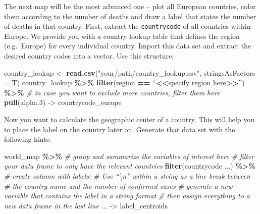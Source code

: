 \documentclass[
  11pt,
]{article}
\newenvironment{Shaded}{\begin{snugshade}}{\end{snugshade}}
\newcommand{\CommentTok}[1]{\textcolor[rgb]{0.56,0.35,0.01}{\textit{#1}}}
\newcommand{\DataTypeTok}[1]{\textcolor[rgb]{0.13,0.29,0.53}{#1}}
\newcommand{\ErrorTok}[1]{\textcolor[rgb]{0.64,0.00,0.00}{\textbf{#1}}}
\newcommand{\FloatTok}[1]{\textcolor[rgb]{0.00,0.00,0.81}{#1}}
\newcommand{\KeywordTok}[1]{\textcolor[rgb]{0.13,0.29,0.53}{\textbf{#1}}}
\newcommand{\NormalTok}[1]{#1}
\newcommand{\OperatorTok}[1]{\textcolor[rgb]{0.81,0.36,0.00}{\textbf{#1}}}
\newcommand{\StringTok}[1]{\textcolor[rgb]{0.31,0.60,0.02}{#1}}
\newenvironment{tips}[1]
  {
  \begin{itemize}
  \footnotesize
  \renewcommand{\labelitemi}{
    \raisebox{-.7\height}[0pt][0pt]{
      {\setkeys{Gin}{width=3em,keepaspectratio}
        \texttt{[image: images/\#1.png]}}
    }
  }
  \setlength{\fboxsep}{1em}
  \begin{rbox}
  \item
  }
  {
  \end{rbox}
  \end{itemize}
  }
\begin{document}
\begin{tips}r

The next map will be the most advanced one -- plot all European countries, color them according to the number of deaths and draw a label that states the number of deaths in that country. First, extract the \texttt{countrycode} of all countries within Europe. We provide you with a country lookup table that defines the region (e.g.~Europe) for every individual country. Import this data set and extract the desired country codes into a vector. Use this structure:

\begin{Shaded}
\begin{Highlighting}[]
\NormalTok{country\_lookup \textless{}{-}}\StringTok{ }\KeywordTok{read.csv}\NormalTok{(}\StringTok{"your/path/country\_lookup.csv"}\NormalTok{, }\DataTypeTok{stringsAsFactors =}\NormalTok{ T)}
\NormalTok{country\_lookup }\OperatorTok{\%\textgreater{}\%}\StringTok{ }
\StringTok{  }\KeywordTok{filter}\NormalTok{(region }\OperatorTok{==}\StringTok{ }\NormalTok{“}\OperatorTok{\textless{}}\ErrorTok{\textless{}}\NormalTok{specify region here}\OperatorTok{\textgreater{}}\ErrorTok{\textgreater{}}\NormalTok{”) }\OperatorTok{\%\textgreater{}\%}
\StringTok{  }\CommentTok{\# in case you want to exclude more countries, filter them here         }
\StringTok{  }\KeywordTok{pull}\NormalTok{(alpha}\FloatTok{.3}\NormalTok{) {-}\textgreater{}}\StringTok{ }\NormalTok{countrycode\_europe}
\end{Highlighting}
\end{Shaded}

Now you want to calculate the geographic center of a country. This will help you to place the label on the country later on. Generate that data set with the following hints:

\begin{Shaded}
\begin{Highlighting}[]
\NormalTok{world\_map }\OperatorTok{\%\textgreater{}\%}\StringTok{ }
\CommentTok{\# group and summarize the variables of interest here  }
\CommentTok{\# filter your data frame to only have the relevant countries}
\StringTok{  }\KeywordTok{filter}\NormalTok{(countrycode ...) }\OperatorTok{\%\textgreater{}\%}
\CommentTok{\# create column with labels:}
\CommentTok{\# Use “\textbackslash{}n” within a string as a line break between }
\CommentTok{\# the country name and the number of confirmed cases}
\CommentTok{\# generate a new variable that contains the label in a string format}
\CommentTok{\# then assign everything to a new data frame in the last line}
\NormalTok{... {-}\textgreater{}}\StringTok{ }\NormalTok{label\_centroids}
\end{Highlighting}
\end{Shaded}


\end{tips}
\end{document}
